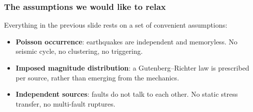 \documentclass[9pt,ignorenonframetext,mathserif,aspectratio=169,xcolor=dvipsnames]{beamer}
\begin{document}
\begin{frame}[t]\frametitle{The assumptions we would like to relax}

Everything in the previous slide rests on a set of convenient
assumptions:

\begin{itemize}
  \item<1-> \textbf{Poisson occurrence}: earthquakes are independent and
        memoryless. No seismic cycle, no clustering, no triggering.
  \item<2-> \textbf{Imposed magnitude distribution}: a Gutenberg--Richter
        law is prescribed per source, rather than emerging from the
        mechanics.
  \item<3-> \textbf{Independent sources}: faults do not talk to each other.
        No static stress transfer, no multi-fault ruptures.
\end{itemize}

\vspace{0.3cm}
\end{frame}

\end{document}
